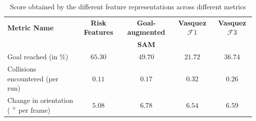 \begin{table}[htbp]
	\begin{center}
		\renewcommand{\arraystretch}{1.5}
		\begin{tabular}{|p{2.5cm}|c|c|c|c|}
			\hline
			\textbf{Metric Name} & \textbf{Risk Features} & \textbf{Goal-augmented}  & \textbf{Vasquez $\mathcal{F}1$} & \textbf{Vasquez $\mathcal{F}3$}\\
			  &   & \textbf{SAM}  &  &  \\
			\hline
			Goal reached (in $\%$) & $65.30$ & $49.70$ & $21.72$ & $36.74$ \\
			Collisions encountered (per run) & $0.11$ & $0.17$ & $0.32$ & $0.26$\\
			Change in orientation ( $\degree$ per frame)  & $5.08$ & $6.78$ &  $6.54$ & $ 6.59$\\ %
			\hline
		\end{tabular}
	\end{center}
	\caption{Score obtained by the different feature representations across different metrics}
	\label{tab:inter_irl_numerical_comparison}
\end{table}\\

